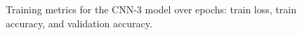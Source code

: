 \documentclass{article}
\begin{document}
\begin{figure}[hbtp]
    \caption{Training metrics for the CNN-3 model over epochs: train loss, train accuracy, and validation accuracy.}
    \label{fig:cnn3_training_metrics}
\end{figure}

\clearpage




\end{document}
